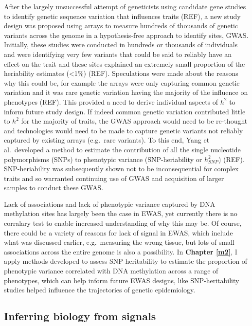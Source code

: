\documentclass[11pt,twoside]{bristolthesis}
\begin{document}
After the largely unsuccessful attempt of geneticists using candidate gene studies to identify genetic sequence variation that influences traits (REF), a new study design was proposed using arrays to measure hundreds of thousands of genetic variants across the genome in a hypothesis-free approach to identify sites, GWAS. Initially, these studies were conducted in hundreds or thousands of individuals and were identifying very few variants that could be said to reliably have an effect on the trait and these sites explained an extremely small proportion of the heriability estimates (\textless1\%) (REF). Speculations were made about the reasons why this could be, for example the arrays were only capturing common genetic variation and it was rare genetic variation having the majority of the influence on phenotypes (REF). This provided a need to derive individual aspects of \(h^2\) to inform future study design. If indeed common genetic variation contributed little to \(h^2\) for the majority of traits, the GWAS approach would need to be re-thought and technologies would need to be made to capture genetic variants not reliably captured by existing arrays (e.g.~rare variants). To this end, Yang et al.~developed a method to estimate the contribution of all the single nucleotide polymorphisms (SNPs) to phenotypic variance (SNP-heriability or \(h^2_{SNP}\)) (REF). SNP-heriability was subsequently shown not to be inconsequential for complex traits and so warranted continuing use of GWAS and acquisition of larger samples to conduct these GWAS.

Lack of associations and lack of phenotypic variance captured by DNA methylation sites has largely been the case in EWAS, yet currently there is no corralary test to enable increased understanding of why this may be. Of course, there could be a variety of reasons for lack of signal in EWAS, which include what was discussed earlier, e.g.~measuring the wrong tissue, but lots of small associations across the entire genome is also a possibility. In \textbf{Chapter \ref{m2}}, I apply methods developed to assess SNP-heritability to estimate the proportion of phenotypic variance correlated with DNA methylation across a range of phenotypes, which can help inform future EWAS designs, like SNP-heritability studies helped influence the trajectories of genetic epidemiology.

\hypertarget{inferring-biology-from-signals}{%
\subsection{Inferring biology from signals}\label{inferring-biology-from-signals}}
\end{document}
